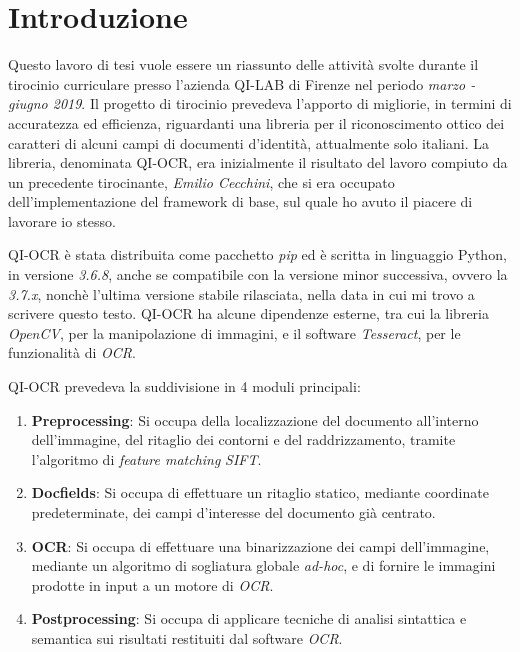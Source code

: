 \chapter*{Introduzione}

Questo lavoro di tesi vuole essere un riassunto delle attivit\`a svolte durante il tirocinio curriculare presso l'azienda QI-LAB di Firenze nel periodo \textit{marzo - giugno 2019}. Il progetto di tirocinio prevedeva l'apporto di migliorie, in termini di accuratezza ed efficienza, riguardanti una libreria per il riconoscimento ottico dei caratteri di alcuni campi di documenti d'identit\`a, attualmente solo italiani. La libreria, denominata QI-OCR, era inizialmente il risultato del lavoro compiuto da un precedente tirocinante, \textit{Emilio Cecchini}, che si era occupato dell'implementazione del framework di base, sul quale ho avuto il piacere di lavorare io stesso.\par
QI-OCR \`e stata distribuita come pacchetto \textit{pip} ed \`e scritta in linguaggio Python, in versione \textit{3.6.8}, anche se compatibile con la versione minor successiva, ovvero la \textit{3.7.x}, nonch\`e l'ultima versione stabile rilasciata, nella data in cui mi trovo a scrivere questo testo. QI-OCR ha alcune dipendenze esterne, tra cui la libreria \textit{OpenCV}, per la manipolazione di immagini, e il software \textit{Tesseract}, per le funzionalit\`a di \textit{OCR}.\par
QI-OCR prevedeva la suddivisione in 4 moduli principali:
\begin{enumerate}
	\item \textbf{Preprocessing}: Si occupa della localizzazione del documento all'interno dell'immagine, del ritaglio dei contorni e del raddrizzamento, tramite l'algoritmo di \textit{feature matching} \textit{SIFT}.
	\item \textbf{Docfields}: Si occupa di effettuare un ritaglio statico, mediante coordinate predeterminate, dei campi d'interesse del documento gi\`a centrato.
	\item \textbf{OCR}: Si occupa di effettuare una binarizzazione dei campi dell'immagine, mediante un algoritmo di sogliatura globale \textit{ad-hoc}, e di fornire le immagini prodotte in input a un motore di \textit{OCR}.
	\item \textbf{Postprocessing}: Si occupa di applicare tecniche di analisi sintattica e semantica sui risultati restituiti dal software \textit{OCR}.
\end{enumerate}\par
